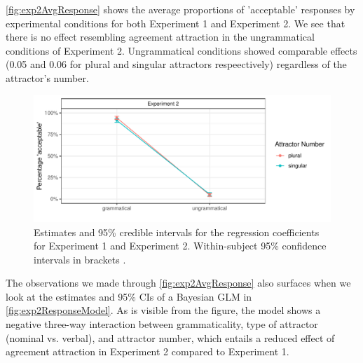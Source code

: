 \documentclass[doc,a4paper,man,natbib,floatsintext,noextraspace]{apa6}\usepackage[]{graphicx}\usepackage[]{color}
\makeatletter
\def\maxwidth{ %
  \ifdim\Gin@nat@width>\linewidth
    \linewidth
  \else
    \Gin@nat@width
  \fi
}
\newenvironment{knitrout}{}{} %
\makeatother
\begin{document}
\autoref{fig:exp2AvgResponse} shows the average proportions of 'acceptable' responses by experimental conditions for both Experiment 1 and Experiment 2. We see that there is no effect resembling agreement attraction in the ungrammatical conditions of Experiment 2. Ungrammatical conditions showed comparable effects (0.05 and 0.06 for plural and singular attractors respeectively) regardless of the attractor's number.  

\begin{knitrout}
\color{fgcolor}\begin{figure}

{\centering \includegraphics[width=\maxwidth]{figure/exp2AvgResponse-1} 

}

\caption{Estimates and 95\% credible intervals for the regression coefficients for Experiment 1 and Experiment 2.  Within-subject 95\% confidence intervals in brackets \cite{Cousineau:2005,Morey:2008}.}\label{fig:exp2AvgResponse}
\end{figure}


\end{knitrout}

The observations we made through \autoref{fig:exp2AvgResponse} also surfaces when we look at the estimates and 95\% CIs of a Bayesian GLM in \autoref{fig:exp2ResponseModel}. As is visible from the figure, the model shows a negative three-way interaction between grammaticality, type of attractor (nominal vs. verbal), and attractor number, which entails a reduced effect of agreement attraction in Experiment 2 compared to Experiment 1. 
\end{document}
